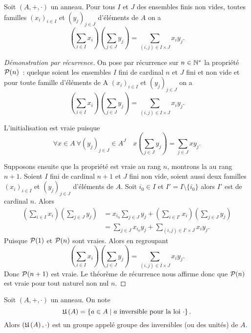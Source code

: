 \begin{theo}
  Soit \((A,+,\cdot)\) un anneau. Pour tous \(I\) et \(J\) des ensembles finis non vides, toutes familles \((x_i)_{i \in I}\) et \((y_j)_{j \in J}\) d'éléments de \(A\) on a
  \begin{equation}
    \left(\sum_{i \in I} x_i \right)\left(\sum_{j \in J} y_j \right) = \sum_{(i,j)\in I\times J} x_iy_j.
  \end{equation}
\end{theo}
\begin{proof}[Démonstration par récurrence]
  On pose par récurrence sur \(n \in \N^*\) la propriété \(\P(n)\)~: quelque soient les ensembles \(I\) fini de cardinal \(n\) et \(J\) fini et non vide et pour toute famille d'éléments de A \((x_i)_{i \in I}\) et \((y_j)_{j \in J}\) on a
\begin{equation} 
  \left(\sum_{i \in I} x_i \right)\left(\sum_{j \in J} y_j \right) = \sum_{(i,j)\in I\times J} x_iy_j.
\end{equation}

L'initialisation est vraie puisque
\begin{equation}
  \forall x \in A \ \forall (y_j)_{j \in J} \in A^J \quad x \left(\sum_{j \in J} y_j \right) = \sum_{j \in J} xy_j.
\end{equation}

Supposons ensuite que la propriété est vraie au rang \(n\), montrons la au rang \(n+1\). Soient \(I\) fini de cardinal \(n+1\) et \(J\) fini non vide, soient aussi deux familles \((x_i)_{i \in I}\) et \((y_j)_{j \in J}\) d'éléments de \(A\). Soit \(i_0 \in I\) et \(I'=I\setminus\{i_0\}\) alors \(I'\) est de cardinal \(n\). Alors
\begin{align}
  \left(\sum_{i \in I} x_i \right)\left(\sum_{j \in J} y_j \right) &=x_{i_0} \sum_{j \in J} y_j + \left(\sum_{i \in I'} x_i \right)\left(\sum_{j \in J} y_j \right) \\
&=\sum_{j \in J} x_{i_0}y_j +  \sum_{(i,j)\in I'\times J} x_iy_j.
\end{align}
Puisque \(\P(1)\) et \(\P(n)\) sont vraies. Alors en regroupant
\begin{equation}
  \left(\sum_{i \in I} x_i \right)\left(\sum_{j \in J} y_j \right) = \sum_{(i,j)\in I\times J} x_iy_j.
\end{equation}
Donc \(\P(n+1)\) est vraie. Le théorème de récurrence nous affirme donc que \(\P(n)\) est vraie pour tout naturel non nul \(n\).
\end{proof}
\begin{theo}\label{theo:uinversible}
  Soit \((A,+,\cdot)\) un anneau. On note 
\begin{equation}
\uinv{A}=\enstq{a \in A}{a \text{~inversible pour la loi~} \cdot}. 
\end{equation}
Alors \((\uinv{A},\cdot)\) est un groupe appelé groupe des inversibles (ou des unités) de \(A\).
\end{theo}
